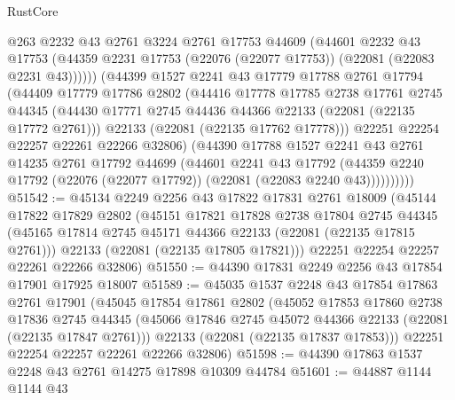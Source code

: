 \begin{lexlean}{RustCore}
\begin{coremodule}
                @263
                @2232
                @43
                @2761
                @3224
                @2761
                @17753
                @44609
                (@44601
                  @2232
                  @43
                  @17753
                  (@44359 @2231 @17753 (@22076 (@22077 @17753)) (@22081 (@22083 @2231 @43))))))
            (@44399
              @1527
              @2241
              @43
              @17779
              @17788
              @2761
              @17794
              (@44409
                @17779
                @17786
                @2802
                (@44416
                  @17778
                  @17785
                  @2738
                  @17761
                  @2745
                  @44345
                  (@44430 @17771 @2745 @44436 @44366 @22133 (@22081 (@22135 @17772 @2761)))
                  @22133
                  (@22081 (@22135 @17762 @17778)))
                @22251
                @22254
                @22257
                @22261
                @22266
                @32806)
              (@44390
                @17788
                @1527
                @2241
                @43
                @2761
                @14235
                @2761
                @17792
                @44699
                (@44601
                  @2241
                  @43
                  @17792
                  (@44359 @2240 @17792 (@22076 (@22077 @17792)) (@22081 (@22083 @2240 @43))))))))))
@51542 := @45134
    @2249
    @2256
    @43
    @17822
    @17831
    @2761
    @18009
    (@45144
      @17822
      @17829
      @2802
      (@45151
        @17821
        @17828
        @2738
        @17804
        @2745
        @44345
        (@45165 @17814 @2745 @45171 @44366 @22133 (@22081 (@22135 @17815 @2761)))
        @22133
        (@22081 (@22135 @17805 @17821)))
      @22251
      @22254
      @22257
      @22261
      @22266
      @32806)
@51550 := @44390 @17831 @2249 @2256 @43 @17854 @17901 @17925 @18007
@51589 := @45035
    @1537
    @2248
    @43
    @17854
    @17863
    @2761
    @17901
    (@45045
      @17854
      @17861
      @2802
      (@45052
        @17853
        @17860
        @2738
        @17836
        @2745
        @44345
        (@45066 @17846 @2745 @45072 @44366 @22133 (@22081 (@22135 @17847 @2761)))
        @22133
        (@22081 (@22135 @17837 @17853)))
      @22251
      @22254
      @22257
      @22261
      @22266
      @32806)
@51598 := @44390 @17863 @1537 @2248 @43 @2761 @14275 @17898 @10309 @44784
@51601 := @44887 @1144 @1144 @43

\end{coremodule}
\end{lexlean}
